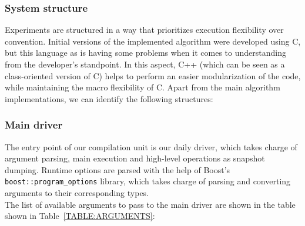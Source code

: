 \subsubsection{System structure}
Experiments are structured in a way that prioritizes execution flexibility over convention. Initial versions of the implemented algorithm were developed using C, but this language as is having some problems when it comes to understanding from the developer's standpoint. In this aspect, C++ (which can be seen as a class-oriented version of C) helps to perform an easier modularization of the code, while maintaining the macro flexibility of C. Apart from the main algorithm implementations, we can identify the following structures:\\

\subsubsection{Main driver}
The entry point of our compilation unit is our daily driver, which takes charge of argument parsing, main execution and high-level operations as snapshot dumping.  Runtime options are parsed with the help of Boost's \texttt{boost::program\_options} library, which takes charge of parsing and converting arguments to their corresponding types. \\

The list of available arguments to pass to the main driver are shown in the table shown in Table~\ref{TABLE:ARGUMENTS}:\\


